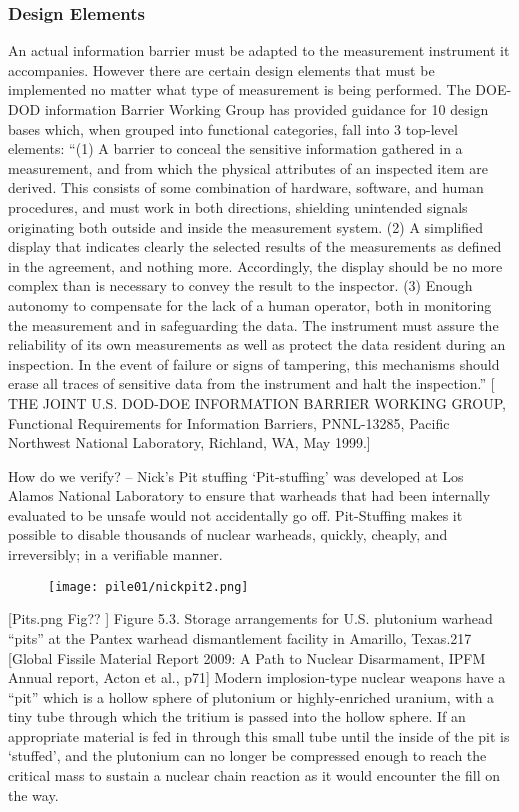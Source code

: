 \documentclass[twocolumn,a4paper]{article}
\begin{document}
\subsubsection{Design Elements}
An actual information barrier must be adapted to the measurement
instrument it accompanies. However there are certain design elements
that must be implemented no matter what type of measurement is being
performed. The DOE-DOD information Barrier Working Group has provided
guidance for 10 design bases which, when grouped into functional
categories, fall into 3 top-level elements: ``(1) A barrier to conceal
the sensitive information gathered in a measurement, and from which
the physical attributes of an inspected item are derived. This
consists of some combination of hardware, software, and human
procedures, and must work in both directions, shielding unintended
signals originating both outside and inside the measurement system.
(2) A simplified display that indicates clearly the selected results
of the measurements as defined in the agreement, and nothing
more. Accordingly, the display should be no more complex than is
necessary to convey the result to the inspector.  (3) Enough autonomy
to compensate for the lack of a human operator, both in monitoring the
measurement and in safeguarding the data. The instrument must assure
the reliability of its own measurements as well as protect the data
resident during an inspection. In the event of failure or signs of
tampering, this mechanisms should erase all traces of sensitive data
from the instrument and halt the inspection.''  [ THE JOINT
  U.S. DOD-DOE INFORMATION BARRIER WORKING GROUP, Functional
  Requirements for Information Barriers, PNNL-13285, Pacific Northwest
  National Laboratory, Richland, WA, May 1999.]

How do we verify? -- Nick’s Pit stuffing `Pit-stuffing' was developed
at Los Alamos National Laboratory to ensure that warheads that had
been internally evaluated to be unsafe would not accidentally go
off. Pit-Stuffing makes it possible to disable thousands of nuclear
warheads, quickly, cheaply, and irreversibly; in a verifiable manner.

\begin{figure}
  \texttt{[image: pile01/nickpit2.png]}
\end{figure}

[Pits.png Fig?? ] Figure 5.3. Storage arrangements for U.S. plutonium
warhead ``pits'' at the Pantex warhead dismantlement facility in
Amarillo, Texas.217 [Global Fissile Material Report 2009: A Path to
  Nuclear Disarmament, IPFM Annual report, Acton et al., p71] Modern
implosion-type nuclear weapons have a ``pit'' which is a hollow sphere
of plutonium or highly-enriched uranium, with a tiny tube through
which the tritium is passed into the hollow sphere. If an appropriate
material is fed in through this small tube until the inside of the pit
is ‘stuffed’, and the plutonium can no longer be compressed enough to
reach the critical mass to sustain a nuclear chain reaction as it
would encounter the fill on the way.
\end{document}
